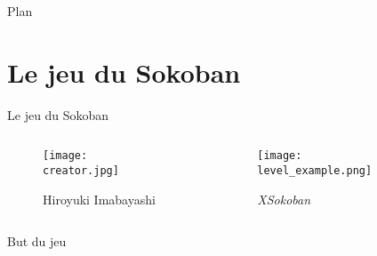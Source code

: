 




    \maketitle

    \begin{frame}{Plan}
        \tableofcontents%
    \end{frame}

    \section{Le jeu du Sokoban}
        \begin{frame}{Le jeu du Sokoban}
            \begin{columns}
                \begin{column}{0.3\textwidth}
                    \begin{figure}
                        \centering
                        \texttt{[image: creator.jpg]}
                        \caption*{Hiroyuki Imabayashi}
                    \end{figure}
                \end{column}
                \begin{column}{0.7\textwidth}
                    \begin{figure}
                        \centering
                        \texttt{[image: level\_example.png]}
                        \caption*{\textit{XSokoban}}
                    \end{figure}
                \end{column}
            \end{columns}
        \end{frame}

        \begin{frame}{But du jeu}
            \centering
        \end{frame}

